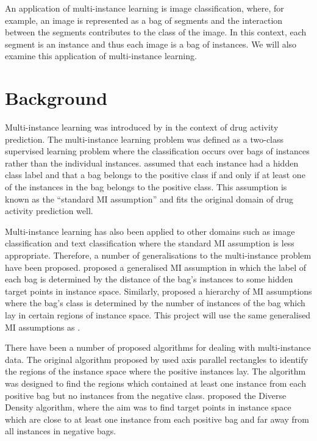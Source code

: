 \documentclass[a4paper,12pt]{article} %
\begin{document}
An application of multi-instance learning is image classification, where, for example, an image is represented as a bag of segments and the interaction between the segments contributes to the class of the image. In this context, each segment is an instance and thus each image is a bag of instances. We will also examine this application of multi-instance learning.

\section{Background}

Multi-instance learning was introduced by  in the context of drug activity prediction. The multi-instance learning problem was defined as a two-class supervised learning problem where the classification occurs over bags of instances rather than the individual instances.  assumed that each instance had a hidden class label and that a bag belongs to the positive class if and only if at least one of the instances in the bag belongs to the positive class. This assumption is known as the ``standard MI assumption'' and fits the original domain of drug activity prediction well.

Multi-instance learning has also been applied to other domains such as image classification and text classification where the standard MI assumption is less appropriate. Therefore, a number of generalisations to the multi-instance problem have been proposed.
 proposed a generalised MI assumption in which the label of each bag is determined by the distance of the bag's instances to some hidden target points in instance space.
Similarly,  proposed a hierarchy of MI assumptions where the bag's class is determined by the number of instances of the bag which lay in certain regions of instance space.
This project will use the same generalised MI assumptions as .

There have been a number of proposed algorithms for dealing with multi-instance data. The original algorithm proposed by  used axis parallel rectangles to identify the regions of the instance space where the positive instances lay. The algorithm was designed to find the regions which contained at least one instance from each positive bag but no instances from the negative class. 
 proposed the Diverse Density algorithm, where the aim was to find target points in instance space which are close to at least one instance from each positive bag and far away from all instances in negative bags.
\end{document}
